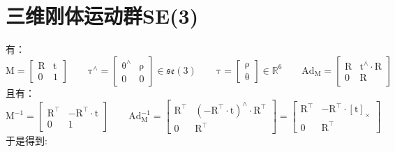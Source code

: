\documentclass[12pt, onecolumn]{article}
\newcommand\normf{\fangsong}
\newcommand\skewmat[1]{\left[ #1 \right]_\times}
\newcommand\liehat[1]{#1^{\land}}
\newcommand\bsm[1]{\boldsymbol{\mathrm{#1}}}
\begin{document}
	\section{\normf 三维刚体运动群SE(3)}
	有：
	\begin{equation}
	\bsm{M}=\begin{bmatrix}
	\bsm{R}&\bsm{t}\\
	\bsm{0}&1
	\end{bmatrix}
	\qquad
	\liehat{\bsm{\tau}}=\begin{bmatrix}
	\liehat{\bsm\theta}&\bsm{\rho}\\
	\bsm{0}&0
	\end{bmatrix}\in\mathfrak{se}(3)
	\qquad
	\bsm{\tau}=\begin{bmatrix}
	\bsm{\rho}\\\bsm\theta
	\end{bmatrix}\in\mathbb{R}^6
	\qquad
	\bsm{Ad}_{\bsm{M}}=\begin{bmatrix}
	\bsm{R}&\liehat{\bsm{t}}\cdot\bsm{R}\\
	\bsm{0}&\bsm{R}
	\end{bmatrix}
	\end{equation}
	且有：
	\begin{equation}
	\bsm{M}^{-1}=\begin{bmatrix}
	\bsm{R}^\top&-\bsm{R}^\top\cdot\bsm{t}\\
	\bsm{0}&1
	\end{bmatrix}
		\qquad
		\bsm{Ad}_{\bsm{M}}^{-1}=\begin{bmatrix}
			\bsm{R}^\top&\liehat{\left( -\bsm{R}^\top\cdot\bsm{t}\right) }\cdot\bsm{R}^\top\\
			\bsm{0}&\bsm{R}^\top
			\end{bmatrix}
		=\begin{bmatrix}
					\bsm{R}^\top&-\bsm{R}^\top\cdot\skewmat{\bsm{t}}\\
					\bsm{0}&\bsm{R}^\top
					\end{bmatrix}
	\end{equation}
	于是得到:
\end{document}
